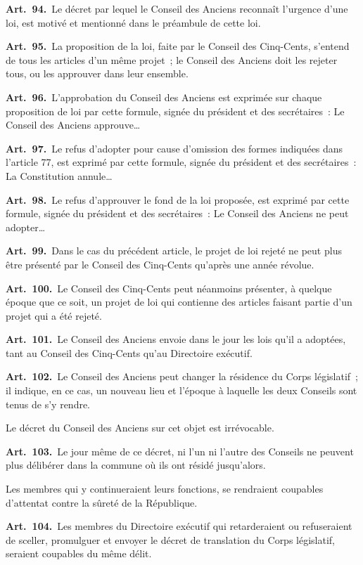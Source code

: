 \documentclass[french,twoside]{book} %
\newcommand{\labelchar}[1]{\textbf{\color{rubric} #1}}
\begin{document}
\labelchar{Art. 94.} Le décret par lequel le Conseil des Anciens reconnaît l’urgence d’une loi, est motivé et mentionné dans le préambule de cette loi.\par
\labelchar{Art. 95.} La proposition de la loi, faite par le Conseil des Cinq-Cents, s’entend de tous les articles d’un même projet ; le Conseil des Anciens doit les rejeter tous, ou les approuver dans leur ensemble.\par
\labelchar{Art. 96.} L’approbation du Conseil des Anciens est exprimée sur chaque proposition de loi par cette formule, signée du président et des secrétaires : Le Conseil des Anciens approuve…\par
\labelchar{Art. 97.} Le refus d’adopter pour cause d’omission des formes indiquées dans l’article 77, est exprimé par cette formule, signée du président et des secrétaires : La Constitution annule…\par
\labelchar{Art. 98.} Le refus d’approuver le fond de la loi proposée, est exprimé par cette formule, signée du président et des secrétaires : Le Conseil des Anciens ne peut adopter…\par
\labelchar{Art. 99.} Dans le cas du précédent article, le projet de loi rejeté ne peut plus être présenté par le Conseil des Cinq-Cents qu’après une année révolue.\par
\labelchar{Art. 100.} Le Conseil des Cinq-Cents peut néanmoins présenter, à quelque époque que ce soit, un projet de loi qui contienne des articles faisant partie d’un projet qui a été rejeté.\par
\labelchar{Art. 101.} Le Conseil des Anciens envoie dans le jour les lois qu’il a adoptées, tant au Conseil des Cinq-Cents qu’au Directoire exécutif.\par
\labelchar{Art. 102.} Le Conseil des Anciens peut changer la résidence du Corps législatif ; il indique, en ce cas, un nouveau lieu et l’époque à laquelle les deux Conseils sont tenus de s’y rendre.\par
Le décret du Conseil des Anciens sur cet objet est irrévocable.\par
\labelchar{Art. 103.} Le jour même de ce décret, ni l’un ni l’autre des Conseils ne peuvent plus délibérer dans la commune où ils ont résidé jusqu’alors.\par
Les membres qui y continueraient leurs fonctions, se rendraient coupables d’attentat contre la sûreté de la République.\par
\labelchar{Art. 104.} Les membres du Directoire exécutif qui retarderaient ou refuseraient de sceller, promulguer et envoyer le décret de translation du Corps législatif, seraient coupables du même délit.\par
\end{document}
